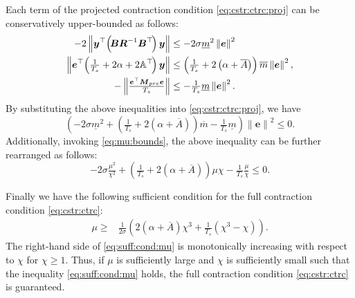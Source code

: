 \documentclass{ifacconf}
\newcommand*{\mv}[1]{\boldsymbol{#1}} %
\newcommand*{\mm}[1]{\boldsymbol{#1}} %
\newcommand*{\norm}[1]{\left\lVert #1 \right\rVert} %
\begin{document}
\begin{pf}
   Each term of the projected contraction condition \eqref{eq:cstr:ctrc:proj} can be conservatively upper-bounded as follows:
   \begin{align}
      -2
      \norm{
         \mv{y}^\top 
         \!
         \left(
         \!
            \mm{B} 
            \mm{R}^{-1} 
            \mm{B}^\top
         \!
         \right)
         \mv{y}
      }
      &\le
      -2\sigma\underline{m}^2
      \norm{\mv{e}}^2
      \\
      \norm{
         \mv{e}^\top
         \!
         \left(
            \tfrac{1}{T_s}+2\alpha
            +
            2\mathbb{A}^\top
         \!
         \right)
         \mv{y}
      }
      &\le
      \left(
         \tfrac{1}{T_s}
         +
         2
         \left(
            \alpha
            +
            \overline{A}
         \right)
      \right)
      \overline{m}
      \norm{\mv{e}}^2
      ,
      \\
      -
      \norm{
         \tfrac{\mv{e}^\top \mm{M}_{\rm{pre}} \mv{e}}{T_s}
      }
      &\le
      -
      \tfrac{1}{T_s}\underline{m}
      \norm{\mv{e}}^2
      . 
   \end{align}
   By substituting the above inequalities into \eqref{eq:cstr:ctrc:proj}, we have
   \begin{equation}
      \left(
      -2\sigma\underline{m}^2
      +
      \left(
         \tfrac{1}{T_s}
         +
         2
         \left(
            \alpha
            +
            \overline{A}
         \right)
      \right)
      \overline{m}
      -\tfrac{1}{T_s}\underline{m}
      \right) 
      \norm{\mv{e}}^2
      \le 0
      .
   \end{equation}
   Additionally, invoking \eqref{eq:mu:bounds}, the above inequality can be further rearranged as follows:
   \begin{equation}
      -2\sigma \tfrac{\mu^2}{\chi^2}
      +
      \left(
         \tfrac{1}{T_s}
         +
         2
         \left(
            \alpha
            +
            \overline{A}
         \right)
      \right)
      \mu \chi
      -\tfrac{1}{T_s}\tfrac{\mu}{\chi}
      \le 0
      .
   \end{equation}
   
   Finally we have the following sufficient condition for the full contraction condition \eqref{eq:cstr:ctrc}:
   \begin{align} \label{eq:suff:cond:mu}
      \mu\ge
      &
      \tfrac{1}{2\sigma}
      \left(
         2(\alpha+\overline{A})\chi^3
         +
         \tfrac{1}{T_s}
         \left(
            \chi^3
            -
            \chi
         \right)
      \right)
      .
   \end{align}
   The right-hand side of \eqref{eq:suff:cond:mu} is monotonically increasing with respect to $\chi$ for $\chi\ge 1$.
   Thus, if $\mu$ is sufficiently large and $\chi$ is sufficiently small such that the inequality \eqref{eq:suff:cond:mu} holds, the full contraction condition \eqref{eq:cstr:ctrc} is guaranteed.

\end{pf}
\end{document}
